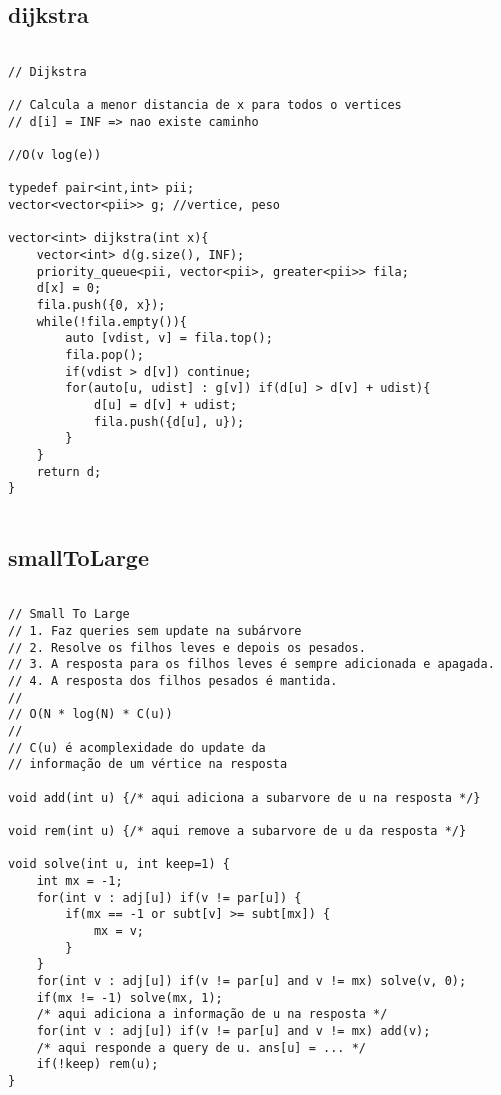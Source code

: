 \documentclass[landscape,twocolumn,10pt,a4paper]{article}
\begin{document}
\subsection{dijkstra}
\begin{verbatim}

// Dijkstra

// Calcula a menor distancia de x para todos o vertices
// d[i] = INF => nao existe caminho

//O(v log(e))

typedef pair<int,int> pii;
vector<vector<pii>> g; //vertice, peso

vector<int> dijkstra(int x){
    vector<int> d(g.size(), INF);
    priority_queue<pii, vector<pii>, greater<pii>> fila;
    d[x] = 0;
    fila.push({0, x});
    while(!fila.empty()){
        auto [vdist, v] = fila.top();
        fila.pop();
        if(vdist > d[v]) continue;
        for(auto[u, udist] : g[v]) if(d[u] > d[v] + udist){
            d[u] = d[v] + udist;
            fila.push({d[u], u});
        }
    }
    return d;
}


\end{verbatim}

\subsection{smallToLarge}
\begin{verbatim}

// Small To Large
// 1. Faz queries sem update na subárvore
// 2. Resolve os filhos leves e depois os pesados. 
// 3. A resposta para os filhos leves é sempre adicionada e apagada. 
// 4. A resposta dos filhos pesados é mantida.
//
// O(N * log(N) * C(u))
// 
// C(u) é acomplexidade do update da
// informação de um vértice na resposta

void add(int u) {/* aqui adiciona a subarvore de u na resposta */}

void rem(int u) {/* aqui remove a subarvore de u da resposta */}
 
void solve(int u, int keep=1) {
    int mx = -1;
    for(int v : adj[u]) if(v != par[u]) {
        if(mx == -1 or subt[v] >= subt[mx]) {
            mx = v;
        }
    }
    for(int v : adj[u]) if(v != par[u] and v != mx) solve(v, 0);
    if(mx != -1) solve(mx, 1);
    /* aqui adiciona a informação de u na resposta */
    for(int v : adj[u]) if(v != par[u] and v != mx) add(v);
    /* aqui responde a query de u. ans[u] = ... */
    if(!keep) rem(u);
}

\end{verbatim}
\end{document}
